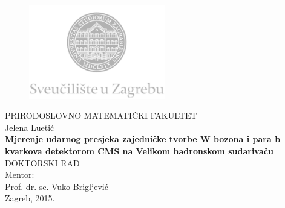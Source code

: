 \documentclass[12pt, twoside]{Thesis}
\begin{document}
\begin{titlepage}
  \fontsize{16pt}{20pt}\selectfont
  \selectfont
  \setlength{\intextsep}{0pt plus 0pt minus 0pt}

  \begin{center}
    \begin{figure}[ht!]
      \begin{center}
        \includegraphics[height=4.1184cm, width=5.94cm]{logo_unizg2}
      \end{center}
    \end{figure}		
    \vspace{0cm}
    {PRIRODOSLOVNO MATEMATIČKI FAKULTET} \\
    \vspace{1.8cm}
    Jelena Luetić \\
    \vspace{1.8cm}
    {\fontsize{22pt}{22pt}\selectfont\textbf{Mjerenje udarnog presjeka zajedničke tvorbe W bozona i para b kvarkova detektorom CMS na Velikom hadronskom sudarivaču}} \\
    \vspace{2cm}    
    DOKTORSKI RAD \\
    \vspace{2cm}    %
    Mentor:\\Prof. dr. sc. Vuko Brigljević \\
    \vfill{Zagreb, 2015.}
  \end{center}
\end{titlepage}



\pagestyle{empty} %

\null\vfill %
\end{document}
